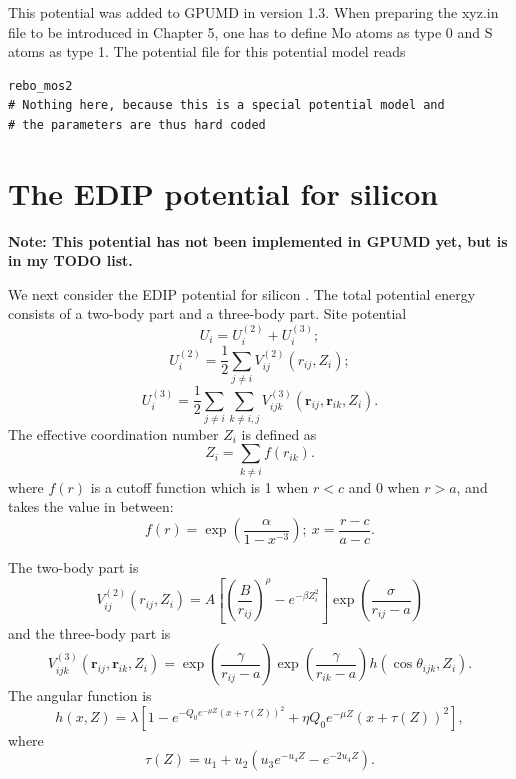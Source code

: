 \documentclass[12pt,a4paper]{report}
\newcommand{\vect}[1]{\boldsymbol{#1}}
\begin{document}
This potential was added to GPUMD in version 1.3. When preparing the xyz.in file to be introduced in Chapter 5, one has to define Mo atoms as type 0 and S atoms as type 1. The potential file for this potential model reads
\begin{verbatim}
rebo_mos2
# Nothing here, because this is a special potential model and 
# the parameters are thus hard coded
\end{verbatim}



\section{The EDIP potential for silicon}


\textbf{Note: This potential has not been implemented in GPUMD yet, but is in my TODO list.}

We next consider the EDIP potential for silicon \cite{bazant1997prb,justo1998prb}. The total potential energy consists of a two-body part and a three-body part. Site potential
\begin{equation}
U_i = U_i^{(2)} + U_i^{(3)};
\end{equation}
\begin{equation}
U_i^{(2)} = \frac{1}{2}\sum_{j\neq i} V^{(2)}_{ij}(r_{ij}, Z_i);
\end{equation}
\begin{equation}
U_i^{(3)} = \frac{1}{2}\sum_{j\neq i}\sum_{k\neq i,j}  V^{(3)}_{ijk} \left(\vect{r}_{ij}, \vect{r}_{ik},  Z_i \right).
\end{equation}
The effective coordination number $Z_i$ is defined as
\begin{equation}
Z_i = \sum_{k\neq i} f(r_{ik}).
\end{equation}
where $f(r)$ is a cutoff function which is 1 when $r<c$ and 0 when $r>a$, and takes the value in between:
\begin{equation}
f(r) = \exp\left( \frac{\alpha}{1-x^{-3}}\right); ~ x = \frac{r-c}{a-c}.
\end{equation}

The two-body part is
\begin{equation}
V^{(2)}_{ij}(r_{ij},Z_i) =  A
\left[ \left( \frac{B }{ r_{ij} } \right)^{\rho}- e^{-\beta Z_i^2} \right]
\exp\left(   \frac{\sigma}{ r_{ij} - a} \right)
\end{equation}
and the three-body part is
\begin{equation}
V^{(3)}_{ijk}(\vect{r}_{ij}, \vect{r}_{ik}, Z_i) =
\exp\left(   \frac{\gamma}{ r_{ij} - a} \right)
\exp\left(   \frac{\gamma}{ r_{ik} - a} \right)
h \left(\cos \theta_{ijk} , Z_i \right).
\end{equation}
The angular function is
\begin{equation}
h \left(x , Z \right) =
\lambda \left[1 - e^{ -Q_0 e^{-\mu Z} (x + \tau(Z))^2}  + \eta Q_0 e^{-\mu Z} (x + \tau(Z))^2 \right],
\end{equation}
where
\begin{equation}
\tau(Z) = u_1 + u_2(u_3 e^{-u_4 Z} - e^{-2u_4 Z} ).
\end{equation}
\end{document}
